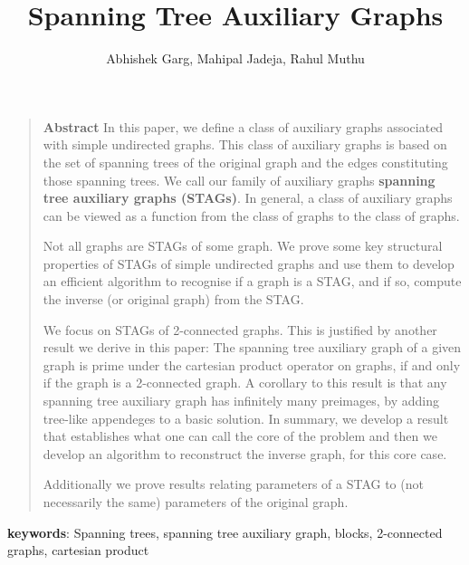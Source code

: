\documentclass{llncs}
\title{{\bf Spanning Tree Auxiliary Graphs}}
\institute{Dhirubhai Ambani Institute of Information  Communication Technology, Gandhinagar, India\\ \email{\{abhishekgarg2009@gmail.com, jadeja\_mahipal@daiict.ac.in, rahul\_muthu@daiict.ac.in\}}}
\author{Abhishek Garg, Mahipal Jadeja, Rahul Muthu}
\date{}
\begin{document}
\maketitle
\begin{quote}
{\bf Abstract} \small In this paper, we define a class of auxiliary graphs associated with simple undirected graphs. This class of auxiliary graphs is based on the set of spanning trees of the original graph and the edges constituting those spanning trees. We call our family of auxiliary graphs {\bf spanning tree auxiliary graphs (STAGs)}. In general, a class of auxiliary graphs can be viewed as a function from the class of graphs to the class of graphs. 

Not all graphs are STAGs of some graph. We prove some key structural properties of STAGs of simple undirected graphs and use them to develop an efficient algorithm to recognise if a graph is a STAG, and if so, compute the inverse (or original graph) from the STAG.

We focus on STAGs of 2-connected graphs. This is justified by another result we derive in this paper: The spanning tree auxiliary graph of a given graph is prime under the cartesian product operator on graphs, if and only if the graph is a 2-connected graph. A corollary to this result is that any spanning tree auxiliary graph has infinitely many preimages, by adding tree-like appendeges to a basic solution. In summary, we develop a result that establishes what one can call the core of the problem and then we develop an algorithm to reconstruct the inverse graph, for this core case.

Additionally we prove results relating parameters of a STAG to (not necessarily the same) parameters of the original graph.
\end{quote}
{\bf keywords}: Spanning trees, spanning tree auxiliary graph, blocks, 2-connected graphs, cartesian product
\end{document}
